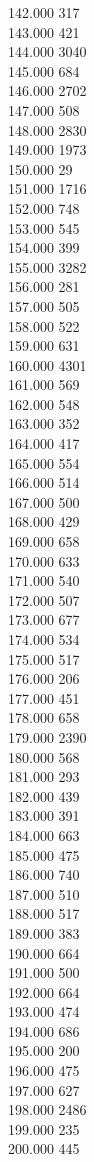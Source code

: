 { 142.000	317 \\
 143.000	421 \\
 144.000	3040 \\
 145.000	684 \\
 146.000	2702 \\
 147.000	508 \\
 148.000	2830 \\
 149.000	1973 \\
 150.000	29 \\
 151.000	1716 \\
 152.000	748 \\
 153.000	545 \\
 154.000	399 \\
 155.000	3282 \\
 156.000	281 \\
 157.000	505 \\
 158.000	522 \\
 159.000	631 \\
 160.000	4301 \\
 161.000	569 \\
 162.000	548 \\
 163.000	352 \\
 164.000	417 \\
 165.000	554 \\
 166.000	514 \\
 167.000	500 \\
 168.000	429 \\
 169.000	658 \\
 170.000	633 \\
 171.000	540 \\
 172.000	507 \\
 173.000	677 \\
 174.000	534 \\
 175.000	517 \\
 176.000	206 \\
 177.000	451 \\
 178.000	658 \\
 179.000	2390 \\
 180.000	568 \\
 181.000	293 \\
 182.000	439 \\
 183.000	391 \\
 184.000	663 \\
 185.000	475 \\
 186.000	740 \\
 187.000	510 \\
 188.000	517 \\
 189.000	383 \\
 190.000	664 \\
 191.000	500 \\
 192.000	664 \\
 193.000	474 \\
 194.000	686 \\
 195.000	200 \\
 196.000	475 \\
 197.000	627 \\
 198.000	2486 \\
 199.000	235 \\
 200.000	445 \\
}
